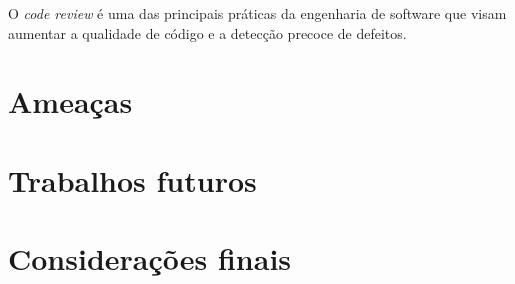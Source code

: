 \documentclass[12pt,openany,oneside,a4paper,english,brazil]{abntbibufjf}
\begin{document}
O \textit{code review} é uma das principais práticas da engenharia de software que visam aumentar a qualidade de código e a detecção precoce de defeitos.

  \section{Ameaças}\label{sec:ameacas}

  \section{Trabalhos futuros}\label{sec:trabalhos_futuros}

  \section{Considerações finais}\label{sec:consideracoes_finais}






\postextual








\end{document}
